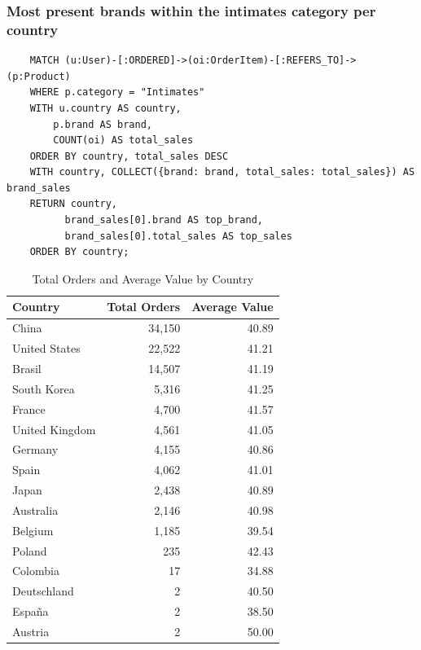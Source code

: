 \documentclass[a4paper,12pt]{article}
\begin{document}
  \subsubsection{Most present brands within the intimates category per country}
  \begin{verbatim}
    MATCH (u:User)-[:ORDERED]->(oi:OrderItem)-[:REFERS_TO]->(p:Product)
    WHERE p.category = "Intimates"
    WITH u.country AS country, 
        p.brand AS brand, 
        COUNT(oi) AS total_sales
    ORDER BY country, total_sales DESC
    WITH country, COLLECT({brand: brand, total_sales: total_sales}) AS brand_sales
    RETURN country, 
          brand_sales[0].brand AS top_brand, 
          brand_sales[0].total_sales AS top_sales
    ORDER BY country;
    \end{verbatim}
    \begin{table}[h!]
      \centering
      \caption{Total Orders and Average Value by Country}
      \label{tab:orders_and_average}
      \begin{tabular}{l r r}
          \toprule
          \textbf{Country} & \textbf{Total Orders} & \textbf{Average Value} \\
          \midrule
          China           & 34,150  & 40.89 \\
          United States   & 22,522  & 41.21 \\
          Brasil          & 14,507  & 41.19 \\
          South Korea     & 5,316   & 41.25 \\
          France          & 4,700   & 41.57 \\
          United Kingdom  & 4,561   & 41.05 \\
          Germany         & 4,155   & 40.86 \\
          Spain           & 4,062   & 41.01 \\
          Japan           & 2,438   & 40.89 \\
          Australia       & 2,146   & 40.98 \\
          Belgium         & 1,185   & 39.54 \\
          Poland          & 235     & 42.43 \\
          Colombia        & 17      & 34.88 \\
          Deutschland     & 2       & 40.50 \\
          España          & 2       & 38.50 \\
          Austria         & 2       & 50.00 \\
          \bottomrule
      \end{tabular}
  \end{table}
\end{document}
